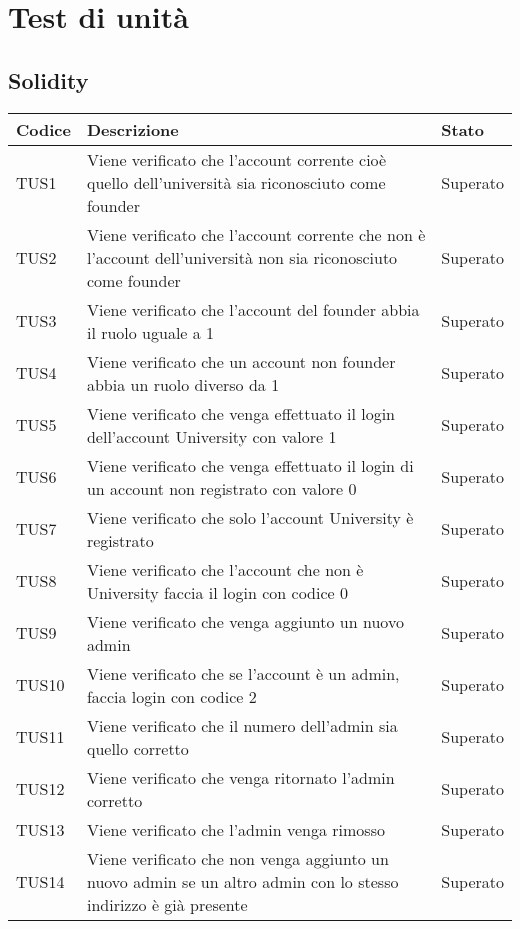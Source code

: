 \documentclass[PianoDiQualifica.tex]{subfiles}
\begin{document}
\chapter{Test di unità}
\section{Solidity}
\begin{longtable}[H]{P{2cm}P{8.5cm}P{3cm}}
	\color{CHeaderText}\textbf{Codice} & 
	\color{CHeaderText}\textbf{Descrizione} & 
	\color{CHeaderText}\textbf{Stato}\\
	\endhead
	TUS1 & Viene verificato che l'account corrente cioè quello dell'università sia riconosciuto come founder & Superato \\ 
	TUS2 & Viene verificato che l'account corrente che non è l'account dell'università non sia riconosciuto come founder & Superato \\
	TUS3 & Viene verificato che l'account del founder abbia il ruolo uguale a 1 & Superato \\
	TUS4 & Viene verificato che un account non founder abbia un ruolo diverso da 1 & Superato \\
	TUS5 & Viene verificato che venga effettuato il login dell'account University con valore 1 & Superato \\
	TUS6 & Viene verificato che venga effettuato il login di un account non registrato con valore 0 & Superato \\
	TUS7 & Viene verificato che solo l'account University è registrato & Superato \\
	TUS8 & Viene verificato che l'account che non è University faccia il login con codice 0 & Superato \\
	TUS9 & Viene verificato che venga aggiunto un nuovo admin & Superato\\
	TUS10 & Viene verificato che se l'account è un admin, faccia login con codice 2 & Superato \\
	TUS11 & Viene verificato che il numero dell'admin sia quello corretto & Superato \\
	TUS12 & Viene verificato che venga ritornato l'admin corretto & Superato \\
	TUS13 & Viene verificato che l'admin venga rimosso & Superato \\
	TUS14 & Viene verificato che non venga aggiunto un nuovo admin se un altro admin con lo stesso indirizzo è già presente & Superato \\

\end{longtable}
\end{document}
